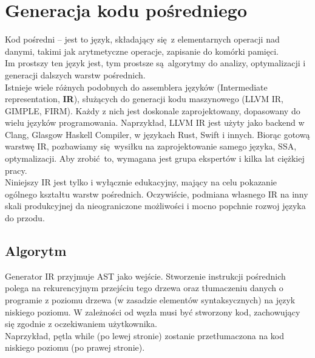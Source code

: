 \section{Generacja kodu pośredniego}
	
	Kod pośredni -- jest to język, składający się z elementarnych operacji nad danymi, takimi jak
	arytmetyczne operacje, zapisanie do komórki pamięci.
	\\
	
	Im prostszy ten język jest, tym prostsze
	są algorytmy do analizy, optymalizacji i generacji dalszych warstw pośrednich.
	\\
	
	Istnieje wiele różnych podobnych do assemblera języków (Intermediate representation, \textbf{IR}), służących
	do generacji kodu maszynowego (LLVM IR, GIMPLE, FIRM). Każdy z nich jest doskonale zaprojektowany, dopasowany
	do wielu języków programowania. Naprzykład, LLVM IR jest użyty jako backend w Clang, Glasgow Haskell Compiler,
	w językach Rust, Swift i innych. Biorąc gotową warstwę IR, pozbawiamy się wysiłku na zaprojektowanie samego
	języka, SSA, optymalizacji. Aby zrobić to, wymagana jest grupa ekspertów i kilka lat ciężkiej pracy.
	\\

	Niniejszy IR jest tylko i wyłącznie edukacyjny, mający na celu pokazanie ogólnego kształtu warstw pośrednich.
	Oczywiście, podmiana własnego IR na inny skali produkcyjnej da nieograniczone możliwości i mocno popchnie
	rozwoj języka do przodu.

	\subsection{Algorytm}
		Generator IR przyjmuje AST jako wejście. Stworzenie instrukcji pośrednich
		polega na rekurencyjnym przejściu tego drzewa oraz tłumaczeniu danych o
		programie z poziomu drzewa (w zasadzie elementów syntaksycznych) na język
		niskiego poziomu. W zależności od węzła musi być stworzony kod, zachowujący
		się zgodnie z oczekiwaniem użytkownika.
		\\
		
		Naprzykład, pętla while (po lewej stronie) zostanie przetłumaczona na
		kod niskiego poziomu (po prawej stronie).

